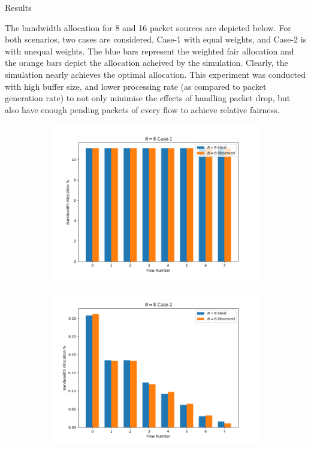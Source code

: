\begin{section}{Results}


The bandwidth allocation for 8 and 16 packet sources are depicted below. For both scenarios, two cases are considered, Case-1 with equal weights, and Case-2 is with unequal weights. The blue bars represent the weighted fair allocation and the orange bars depict the allocation acheived by the simulation. Clearly, the simulation nearly achieves the optimal allocation. This experiment was conducted with high buffer size, and lower processing rate (as compared to packet generation rate) to not only minimise the effects of handling packet drop, but also have enough pending packets of every flow to achieve relative fairness. 

\begin{figure}[h] %
    \centering
    \begin{subfigure}[b]{0.45\textwidth}
        \centering
        \includegraphics[width=\textwidth]{figures/fig1/N=8_1.png} %
        \label{fig:image1}
    \end{subfigure}
    \hfill
    \begin{subfigure}[b]{0.45\textwidth}
        \centering
        \includegraphics[width=\textwidth]{figures/fig1/N=8_2.png} %

\end{subfigure}
\end{figure}
\end{section}
